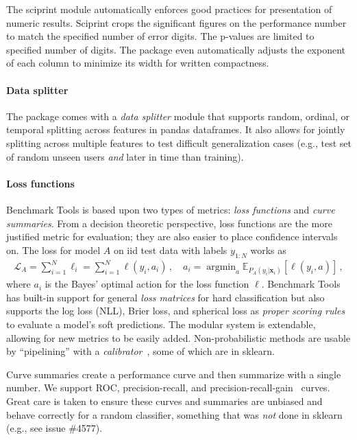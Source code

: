 \documentclass{article}
\renewcommand{\vec}[1]{{\boldsymbol{\mathbf{#1}}}} %
\newcommand{\E}{\mathbb{E}}
\newcommand{\Loss}{\mathcal{L}}
\newcommand{\loss}{\ell}
\DeclareMathOperator*{\argmin}{argmin}
\newcommand{\sectionx}{\paragraph}
\begin{document}
The sciprint module automatically enforces good practices for presentation of numeric results.
Sciprint crops the significant figures on the performance number to match the specified number of error digits.
The p-values are limited to specified number of digits.
The package even automatically adjusts the exponent of each column to minimize its width for written compactness.

\paragraph{Data splitter}
The package comes with a \emph{data splitter} module that supports random, ordinal, or temporal splitting across features in pandas dataframes.
It also allows for jointly splitting across multiple features to test difficult generalization cases (e.g., test set of random unseen users \emph{and} later in time than training)\@.

\sectionx{Loss functions}
Benchmark Tools is based upon two types of metrics: \emph{loss functions} and \emph{curve summaries}.
From a decision theoretic perspective, loss functions are the more justified metric for evaluation; they are also easier to place confidence intervals on.
The loss for model $A$ on iid test data with labels $y_{1:N}$ works as
\begin{align}
  \Loss_A = \sum_{i=1}^N \loss_i = \sum_{i=1}^N \loss(y_i, a_i)\,, \quad a_i = \argmin_a \E_{P_A(y_i|\vec x_i)}[\loss(y_i, a)]\,,
\end{align}
where $a_i$ is the Bayes' optimal action for the loss function $\loss$.
Benchmark Tools has built-in support for general \emph{loss matrices} for hard classification but also supports the log loss (NLL), Brier loss, and spherical loss as \emph{proper scoring rules}~\citep{Gneiting2007} to evaluate a model's soft predictions.
The modular system is extendable, allowing for new metrics to be easily added.
Non-probabilistic methods are usable by ``pipelining'' with a \emph{calibrator}~\citep{Kull2017,Platt1999}, some of which are in sklearn.

Curve summaries create a performance curve and then summarize with a single number.
We support ROC, precision-recall, and precision-recall-gain~\citep{Flach2015} curves.
Great care is taken to ensure these curves and summaries are unbiased and behave correctly for a random classifier, something that was \emph{not} done in sklearn (e.g., see issue \#4577)\@.
\end{document}
